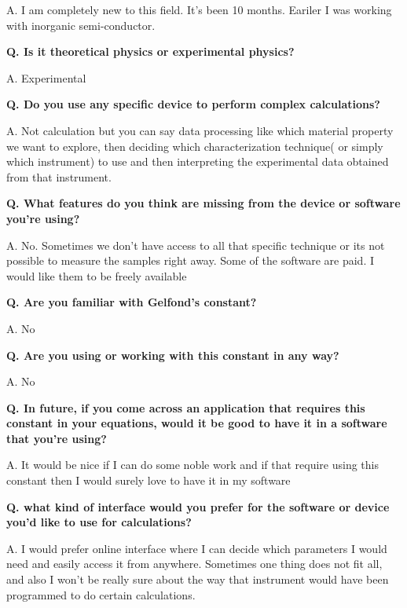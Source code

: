 \documentclass{article}
\begin{document}
A. I am completely new to this field. It's been 10 months. Eariler I was working with inorganic semi-conductor.
\vspace{0.6em}

\textbf{Q. Is it theoretical physics or experimental physics?}

A. Experimental
\vspace{0.6em}

\textbf{Q. Do you use any specific device to perform complex calculations?}

A. Not calculation but you can say data processing like which material property we want to explore, then deciding which characterization technique( or simply which instrument) to use and then interpreting the experimental data obtained from that instrument.
\vspace{0.6em}

\textbf{Q. What features do you think are missing from the device or software you're using?}

A. No. Sometimes we don’t have access to all that specific technique or its not possible to measure the samples right away. Some of the software are paid. I would like them to be freely available
\vspace{0.6em}

\textbf{Q. Are you familiar with Gelfond's constant?}

A. No
\vspace{0.6em}

\textbf{Q. Are you using or working with this constant in any way?}

A. No
\vspace{0.6em}

\textbf{Q. In future, if you come across an application that requires this constant in your equations, would it be good to have it in a software that you're using?}

A. It would be nice if I can do some noble work and if that require using this constant then I would surely love to have it in my software
\vspace{0.6em}

\textbf{Q. what kind of interface would you prefer for the software or device you'd like to use for calculations?}

A. I would prefer online interface where I can decide which parameters I would need and easily access it from anywhere. Sometimes one thing does not fit all, and also I won’t be really sure about the way that instrument would have been programmed to do certain calculations.
\vspace{0.6em}
\end{document}
